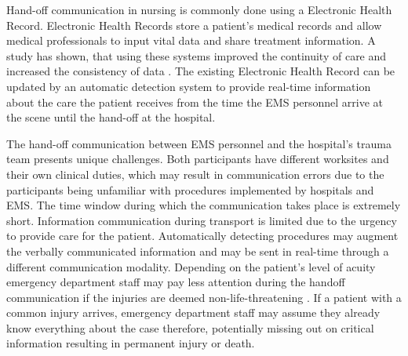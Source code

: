 \par Hand-off communication in nursing is commonly done using a Electronic Health Record. Electronic Health Records store a patient's medical records and allow medical professionals to input vital data and share treatment information. A study has shown, that using these systems improved the continuity of care and increased the consistency of data \cite{COLLINS2011704}. The existing Electronic Health Record can be updated by an automatic detection system to provide real-time information about the care the patient receives from the time the EMS personnel arrive at the scene until the hand-off at the hospital.
\par The hand-off communication between \gls{EMS} personnel and the hospital's trauma team presents unique challenges. Both participants have different worksites and their own clinical duties, which may result in communication errors due to the participants being unfamiliar with procedures implemented by hospitals and EMS. The time window during which the communication takes place is extremely short. Information communication during transport is limited due to the urgency to provide care for the patient. Automatically detecting procedures may augment the verbally communicated information and may be sent in real-time through a different communication modality. Depending on the patient's level of acuity emergency department staff may pay less attention during the handoff communication if the injuries are deemed non-life-threatening \cite{SoletDJNorvellJMRutanGH2005,Meisel2015}. If a patient with a common injury arrives, emergency department staff may assume they already know everything about the case therefore, potentially missing out on critical information resulting in permanent injury or death.

